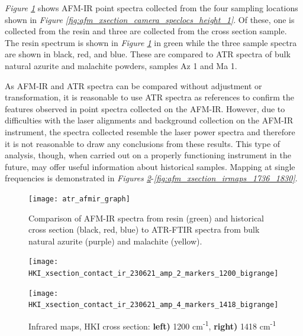 \textit{Figure \ref{fig:atr_afmir_spectra}} shows AFM-IR point spectra collected from the four sampling locations shown in \textit{Figure \ref{fig:afm_xsection_camera_speclocs_height_1}}. Of these, one is collected from the resin and three are collected from the cross section sample. The resin spectrum is shown in \textit{Figure \ref{fig:atr_afmir_spectra}} in green while the three sample spectra are shown in black, red, and blue. These are compared to ATR spectra of bulk natural azurite and malachite powders, samples Az 1 and Ma 1. 

As AFM-IR and ATR spectra can be compared without adjustment or transformation, it is reasonable to use ATR spectra as references to confirm the features observed in point spectra collected on the AFM-IR. However, due to difficulties with the laser alignments and background collection on the AFM-IR instrument, the spectra collected resemble the laser power spectra and therefore it is not reasonable to draw any conclusions from these results. This type of analysis, though, when carried out on a properly functioning instrument in the future, may offer useful information about historical samples. Mapping at single frequencies is demonstrated in \textit{Figures \ref{fig:afm_xsection_irmaps_1200_1418}}-\textit{\ref{fig:afm_xsection_irmaps_1736_1830}}.

\begin{figure}[H]
\centering
  \texttt{[image: atr\_afmir\_graph]}
\caption[Comparison of AFM-IR and ATR-FTIR spectra]{Comparison of AFM-IR spectra from resin (green) and historical cross section (black, red, blue) to ATR-FTIR spectra from bulk natural azurite (purple) and malachite (yellow).}
\label{fig:atr_afmir_spectra}
\end{figure}




\begin{figure}[H]
\centering
\begin{minipage}{.45\textwidth}
  \centering
  \texttt{[image: HKI\_xsection\_contact\_ir\_230621\_amp\_2\_markers\_1200\_bigrange]}
\end{minipage}
\begin{minipage}{.45\textwidth}
  \centering
  \texttt{[image: HKI\_xsection\_contact\_ir\_230621\_amp\_4\_markers\_1418\_bigrange]}
\end{minipage}
\caption[Infrared maps, HKI cross section]{Infrared maps, HKI cross section: \textbf{left)} 1200 cm\textsuperscript{-1}, \textbf{right)} 1418 cm\textsuperscript{-1}}
\label{fig:afm_xsection_irmaps_1200_1418}
\end{figure}

